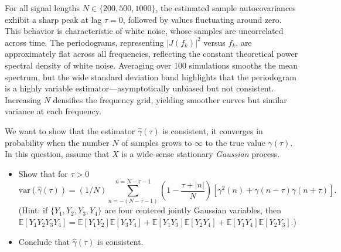 \documentclass[11pt]{article}
\begin{document}
\begin{solution}
For all signal lengths $N \in \{200, 500, 1000\}$, the estimated sample autocovariances exhibit a sharp peak at lag $\tau = 0$, followed by values fluctuating around zero. This behavior is characteristic of white noise, whose samples are uncorrelated across time. The periodograms, representing $|J(f_k)|^2$ versus $f_k$, are approximately flat across all frequencies, reflecting the constant theoretical power spectral density of white noise. Averaging over 100 simulations smooths the mean spectrum, but the wide standard deviation band highlights that the periodogram is a highly variable estimator---asymptotically unbiased but not consistent. Increasing $N$ densifies the frequency grid, yielding smoother curves but similar variance at each frequency.

\end{solution}

\begin{exercise}
    We want to show that the estimator $\hat{\gamma}(\tau)$ is consistent, \ie it converges in probability when the number $N$ of samples grows to $\infty$ to the true value ${\gamma}(\tau)$.
    In this question, assume that $X$ is a wide-sense stationary \textit{Gaussian} process.
    \begin{itemize}
        \item Show that for $\tau>0$ 
    \begin{equation}
       \text{var}(\hat{\gamma}(\tau)) = (1/N) \sum_{n=-(N-\tau-1)}^{n=N-\tau-1} \left(1 - \frac{\tau + |n|}{N}\right) \left[\gamma^2(n) + \gamma(n-\tau)\gamma(n+\tau)\right].
    \end{equation}
    (Hint: if $\{Y_1, Y_2, Y_3, Y_4\}$ are four centered jointly Gaussian variables, then $\mathbb{E}[Y_1 Y_2 Y_3 Y_4] = \mathbb{E}[Y_1 Y_2]\mathbb{E}[Y_3 Y_4] + \mathbb{E}[Y_1 Y_3]\mathbb{E}[Y_2 Y_4] + \mathbb{E}[Y_1 Y_4]\mathbb{E}[Y_2 Y_3]$.) 
    \item Conclude that $\hat{\gamma}(\tau)$ is consistent.
    \end{itemize}
\end{exercise}

\begin{solution}
    
\end{solution}
\end{document}
